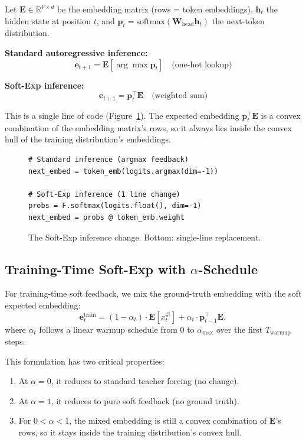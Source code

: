 \documentclass[11pt]{article}
\begin{document}
Let $\mathbf{E} \in \mathbb{R}^{V \times d}$ be the embedding matrix (rows = token embeddings), $\mathbf{h}_t$ the hidden state at position $t$, and $\mathbf{p}_t = \text{softmax}(\mathbf{W}_{\text{head}} \mathbf{h}_t)$ the next-token distribution.

\textbf{Standard autoregressive inference:}
\[
\mathbf{e}_{t+1} = \mathbf{E}[\arg\max \mathbf{p}_t] \quad \text{(one-hot lookup)}
\]

\textbf{Soft-Exp inference:}
\[
\mathbf{e}_{t+1} = \mathbf{p}_t^\top \mathbf{E} \quad \text{(weighted sum)}
\]

This is a single line of code (Figure~\ref{fig:code}). The expected embedding $\mathbf{p}_t^\top \mathbf{E}$ is a convex combination of the embedding matrix's rows, so it always lies inside the convex hull of the training distribution's embeddings.

\begin{figure}[t]
\centering
\begin{verbatim}
# Standard inference (argmax feedback)
next_embed = token_emb(logits.argmax(dim=-1))

# Soft-Exp inference (1 line change)
probs = F.softmax(logits.float(), dim=-1)
next_embed = probs @ token_emb.weight
\end{verbatim}
\caption{The Soft-Exp inference change. Bottom: single-line replacement.}
\label{fig:code}
\end{figure}

\subsection{Training-Time Soft-Exp with $\alpha$-Schedule}
\label{sec:method_training}

For training-time soft feedback, we mix the ground-truth embedding with the soft expected embedding:
\[
\mathbf{e}_t^{\text{train}} = (1 - \alpha_t) \cdot \mathbf{E}[x_t^{\text{gt}}] + \alpha_t \cdot \mathbf{p}_{t-1}^\top \mathbf{E},
\]
where $\alpha_t$ follows a linear warmup schedule from $0$ to $\alpha_{\max}$ over the first $T_{\text{warmup}}$ steps.

This formulation has two critical properties:
\begin{enumerate}
    \item At $\alpha=0$, it reduces to standard teacher forcing (no change).
    \item At $\alpha=1$, it reduces to pure soft feedback (no ground truth).
    \item For $0 < \alpha < 1$, the mixed embedding is still a convex combination of $\mathbf{E}$'s rows, so it stays inside the training distribution's convex hull.
\end{enumerate}
\end{document}
